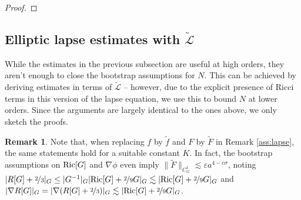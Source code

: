 \documentclass[11pt,leqno,textwidth=10cm]{amsart}
\numberwithin{equation}{section}
\theoremstyle{definition}
\newtheorem{remark}[definition]{Remark}
\theoremstyle{plain}
\newcommand{\1}{\mathbbm{1}}
\newcommand{\E}{\mathcal{E}}
\renewcommand{\L}{\mathcal{L}}
\newcommand{\Ric}{\text{\normalfont{Ric}}}
\newcommand{\vol}[1]{{\text{\normalfont{vol}}}_{#1}}
\renewcommand{\epsilon}{\varepsilon}
\newcommand{\Lap}{\Delta}
\newcommand{\Ltilde}{\tilde{\L}}
\newcommand{\todo}[1]{\textcolor{red}{#1}}
\newcommand{\change}[1]{\color{black}#1\color{black}}
\begin{document}
\begin{proof}
\end{proof}

\subsection{Elliptic lapse estimates with $\Ltilde$}\label{subsec:lapse-Ltilde}

While the estimates in the previous subsection are useful at high orders, they aren't enough to close the bootstrap assumptions for $N$. This can be achieved by deriving estimates in terms of $\Ltilde$ -- however, due to the explicit presence of Ricci terms in this version of the lapse equation, we use this to bound $N$ at \change{lower }orders. Since the arguments are largely identical to the ones above, we only sketch the proofs.

\begin{remark}\label{rem:L-Ltilde-bridge}
Note that, when replacing $f$ by $\tilde{f}$ and $F$ by $\tilde{F}$ in Remark \ref{ass:lapse}, the same statements hold for a suitable constant $K$. In fact, the bootstrap assumptions on $\Ric[G]$ and $\nabla\phi$ even imply $\|\tilde{F}\|_{C^1_G}\lesssim \epsilon a^{4-c\sigma}$, noting $\lvert R[G]+\nicefrac23\rvert_G\leq\lvert G^{-1}\rvert_G\lvert\Ric[G]+\nicefrac29G\rvert_G\lesssim \lvert\Ric[G]+\nicefrac29G\rvert_G$ and $\lvert\nabla R[G]\rvert_G=\lvert\nabla(R[G]+\nicefrac23)\rvert_G\lesssim \lvert\Ric[G]+\nicefrac29G\rvert_G$.%
\end{remark}
\end{document}
